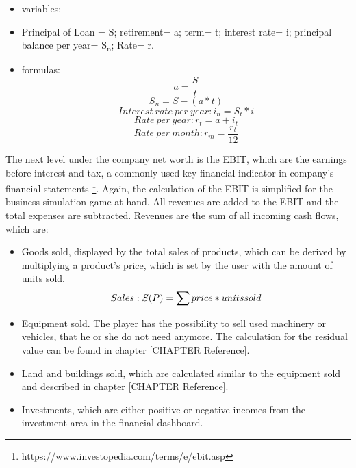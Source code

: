 \begin{itemize}
    \item variables:
    \item Principal of Loan = S; retirement= a; term= t; interest rate= i; principal balance per year= S\textsubscript{n}; Rate= r. 
    \item formulas:
 $$a={\dfrac{S}{t}}$$
 $$S_n=S-(a*t)$$
 $$Interest\ rate\ per\ year: i_n=S_t*i $$
 $$Rate\ per\ year: r_t=a+i_t$$
$$Rate\ per\ month:r_m= {\dfrac{r_t}{12}} $$
    
\end{itemize}


The next level under the company net worth is the EBIT, which are the earnings before interest and tax, a commonly used key financial indicator in company's financial statements \footnote{https://www.investopedia.com/terms/e/ebit.asp}. Again, the calculation of the EBIT is simplified for the business simulation game at hand. All revenues are added to the EBIT and the total expenses are subtracted. Revenues are the sum of all incoming cash flows, which are:
\begin{itemize}
    \item Goods sold, displayed by the total sales of products, which can be derived by multiplying a product’s price, which is set by the user with the amount of units sold.
    \begin{equation}
        Sales: S(P) = \sum price\index{Product} * units sold
    \end{equation}
    \item Equipment sold. The player has the possibility to sell used machinery or vehicles, that he or she do not need anymore. The calculation for the residual value can be found in chapter [CHAPTER Reference].
    \item Land and buildings sold, which are calculated similar to the equipment sold and described in chapter [CHAPTER Reference].
    \item Investments, which are either positive or negative incomes from the investment area in the financial dashboard.
\end{itemize}

